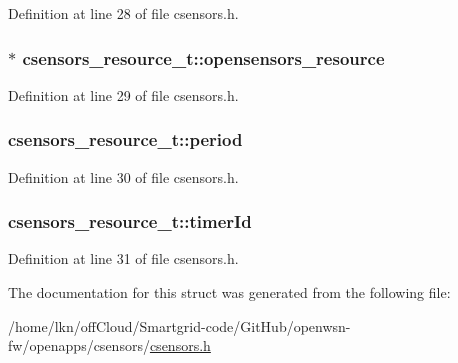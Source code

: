 Definition at line 28 of file csensors.\+h.

\subsubsection[{\texorpdfstring{opensensors\+\_\+resource}{opensensors_resource}}]{$\ast$ csensors\+\_\+resource\+\_\+t\+::opensensors\+\_\+resource}\hypertarget{structcsensors__resource__t_ac08b388304f99deeac3dd9e15208e49d}{}\label{structcsensors__resource__t_ac08b388304f99deeac3dd9e15208e49d}


Definition at line 29 of file csensors.\+h.

\subsubsection[{\texorpdfstring{period}{period}}]{ csensors\+\_\+resource\+\_\+t\+::period}\hypertarget{structcsensors__resource__t_abd80c8fcc840aee4f62109a4000217e9}{}\label{structcsensors__resource__t_abd80c8fcc840aee4f62109a4000217e9}


Definition at line 30 of file csensors.\+h.

\subsubsection[{\texorpdfstring{timer\+Id}{timerId}}]{ csensors\+\_\+resource\+\_\+t\+::timer\+Id}\hypertarget{structcsensors__resource__t_a2b3abfe0ef080bec23a310f228a06003}{}\label{structcsensors__resource__t_a2b3abfe0ef080bec23a310f228a06003}


Definition at line 31 of file csensors.\+h.



The documentation for this struct was generated from the following file\+:\begin{DoxyCompactItemize}
\item 
/home/lkn/off\+Cloud/\+Smartgrid-\/code/\+Git\+Hub/openwsn-\/fw/openapps/csensors/\hyperlink{csensors_8h}{csensors.\+h}\end{DoxyCompactItemize}
